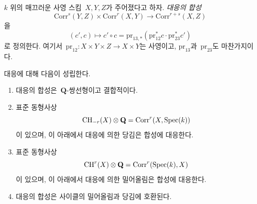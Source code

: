 \medskip\noindent
$k$ 위의 매끄러운 사영 스킴\  $X, Y, Z$가 주어졌다고 하자.
{\it 대응의 합성}
$$
\text{Corr}^s(Y, Z)
\times
\text{Corr}^r(X, Y)
\longrightarrow
\text{Corr}^{r + s}(X, Z)
$$
을
$$
(c', c)
\longmapsto
c' \circ c =
\text{pr}_{13, *}(\text{pr}_{12}^*c \cdot \text{pr}_{23}^*c')
$$
로 정의한다. 여기서\ 
$\text{pr}_{12} : X \times Y \times Z \to X \times Y$는
사영이고, $\text{pr}_{13}$과\  $\text{pr}_{23}$도 마찬가지이다.

\begin{lemma}
\label{lemma-composition-correspondences}
대응에 대해 다음이 성립한다.
\begin{enumerate}
\item 대응의 합성은\  $\mathbf{Q}$-쌍선형이고 결합적이다.
\item 표준 동형사상
$$
\mathop{\mathrm{CH}}\nolimits_{-r}(X) \otimes \mathbf{Q} = \text{Corr}^r(X, \mathop{\mathrm{Spec}}(k))
$$
이 있으며, 이 아래에서 대응에 의한 당김은 합성에 대응한다.
\item 표준 동형사상
$$
\mathop{\mathrm{CH}}\nolimits^r(X) \otimes \mathbf{Q} = \text{Corr}^r(\mathop{\mathrm{Spec}}(k), X)
$$
이 있으며, 이 아래에서 대응에 의한 밀어올림은 합성에 대응한다.
\item 대응의 합성은 사이클의 밀어올림과 당김에 호환된다.
\end{enumerate}
\end{lemma}

